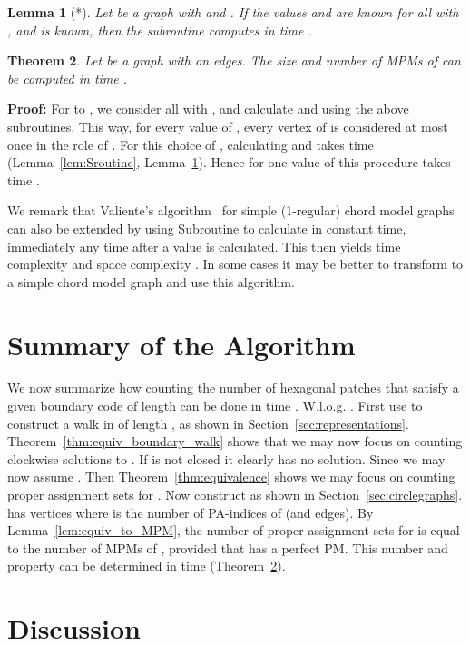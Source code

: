 \documentclass{llncs}
\newcommand{\PF}{{\bf Proof: }}
\newcommand{\QED}{\hspace*{\fill}{}\medskip}
\newtheorem{thm}{Theorem}
\newtheorem{lem}[thm]{Lemma}
\begin{document}
\begin{lem}[*]
\label{lem:Nroutine}
Let  be a graph with  and .
If the values  and  are known for all  with , and  is known,
then the subroutine  computes  in time .
\end{lem}


\begin{thm}
\label{thm:MPM}
Let  be a graph with  on  edges.
The size and number of MPMs of  can be computed in time .
\end{thm}
\PF
For  to , we consider all  with , and calculate  and  using the above subroutines.
This way, for every value of , every vertex of  is considered at most once in the role of . For this choice of , calculating  and  takes time  (Lemma~\ref{lem:Sroutine}, Lemma~\ref{lem:Nroutine}).
Hence for one value of  this procedure takes time .\QED



We remark that Valiente's algorithm~\cite{Val03} for simple (1-regular) chord model graphs can also be extended by using Subroutine  to calculate  in constant time, immediately any time after a value  is calculated. This then yields time complexity  and space complexity . In some cases it may be better to transform to a simple chord model graph and use this algorithm. 


\section{Summary of the Algorithm}
\label{sec:alg}

We now summarize how counting the number of hexagonal patches that satisfy a given boundary code  of length  can be done in time . 
W.l.o.g. .
First use  to construct a walk  in  of length , as shown in Section~\ref{sec:representations}. Theorem~\ref{thm:equiv_boundary_walk} shows that we may now focus on counting clockwise solutions to . If  is not closed it clearly has no solution.
Since  we may now assume . Then Theorem~\ref{thm:equivalence} shows we may focus on counting proper assignment sets for . Now construct  as shown in Section~\ref{sec:circlegraphs}.  has  vertices where  is the number of PA-indices of  (and  edges). By Lemma~\ref{lem:equiv_to_MPM}, the number of proper assignment sets for  is equal to the number of MPMs of , provided that  has a perfect PM. This number and property can be determined in time  (Theorem~\ref{thm:MPM}).




\section{Discussion}
\label{sec:discussion}
\end{document}
